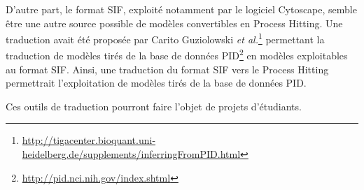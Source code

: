 D'autre part, le format SIF, exploité notamment par le logiciel Cytoscape, semble être une autre source possible de modèles convertibles en Process Hitting.
Une traduction avait été proposée par Carito Guziolowski \textit{et al.}\footnote{\url{http://tigacenter.bioquant.uni-heidelberg.de/supplements/inferringFromPID.html}} permettant la traduction de modèles tirés de la base de données PID\footnote{\url{http://pid.nci.nih.gov/index.shtml}} en modèles exploitables au format SIF.
Ainsi, une traduction du format SIF vers le Process Hitting permettrait l'exploitation de modèles tirés de la base de données PID.

Ces outils de traduction pourront faire l'objet de projets d'étudiants.
